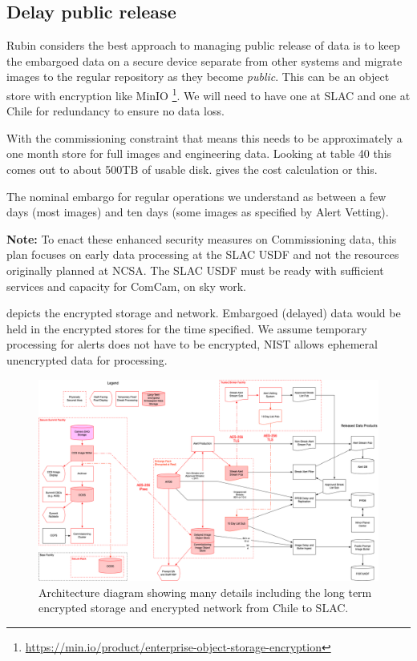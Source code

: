 
\subsection{Delay public release} \label{sec:3delay}

Rubin considers the best approach to managing public release of data is to keep the embargoed data on a secure device separate from other systems and migrate images to the regular repository as they become \emph{public}.
This can be an object store with encryption like MinIO \footnote{\url{ https://min.io/product/enterprise-object-storage-encryption}}.
We will need to have one at \gls{SLAC} and one at Chile for redundancy to ensure no data loss.

With the commissioning constraint that means this needs to be approximately a one month store  for full images and engineering data.
Looking at 
table 40 this comes out to about 500TB of usable disk.
 gives the cost calculation or this.

The nominal embargo for regular operations we understand as between a few days (most images) and ten days (some images as specified by \gls{Alert} Vetting).




{\bf Note:} To enact these enhanced security measures on \gls{Commissioning} data, this plan focuses on early data processing at the SLAC USDF and not the resources originally planned at NCSA. The SLAC USDF must be ready with sufficient services and capacity for ComCam, on sky work.

 depicts the encrypted storage and network. Embargoed (delayed) data would be held in the encrypted stores for the time specified.
We assume temporary processing for alerts does not have to be encrypted, \gls{NIST} allows ephemeral unencrypted data for processing.

\begin{figure}
\begin{centering}
\includegraphics[width=\textwidth]{Embargo_arch}
	\caption{ Architecture diagram showing many details including the long term encrypted storage and encrypted network from Chile to SLAC. \label{fig:arch}}
\end{centering}
\end{figure}
